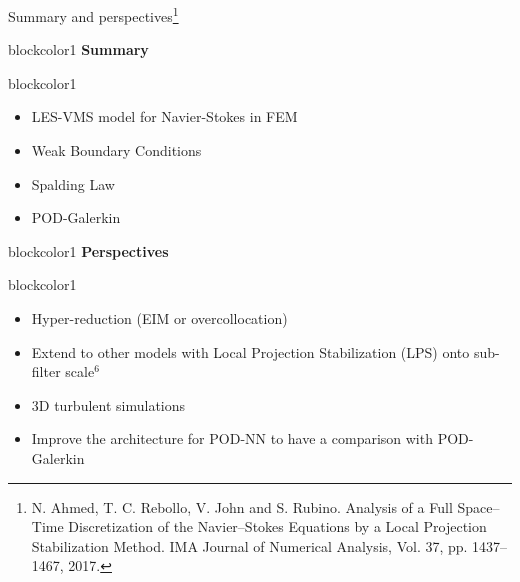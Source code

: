 \documentclass[9pt,compress,t,aspectratio=169]{beamer}
\newcommand{\1}{\begin{pmatrix}
		1\\
		1
\end{pmatrix}}
\newcommand{\highlight}[1]{\textbf{\color{bluemathlab}#1}}
\begin{document}
\begin{frame}[c]{Summary and perspectives\footnote{N. Ahmed, T. C. Rebollo, V. John and S. Rubino. Analysis of a Full Space–Time Discretization of the Navier–Stokes Equations by a Local Projection Stabilization Method. IMA Journal of Numerical Analysis, Vol. 37, pp. 1437–1467, 2017.}}
	\begin{minipage}[t]{0.49\textwidth}
		\begin{beamercolorbox}[sep=0.5em,wd=\textwidth]{blockcolor1}
				\centering
			\highlight{\LARGE Summary}
		\end{beamercolorbox}
		\begin{beamercolorbox}[sep=0.5em,wd=\textwidth]{blockcolor1}
			\Large
			\begin{itemize}
				\item LES-VMS model for Navier-Stokes in FEM
				\item Weak Boundary Conditions
				\item Spalding Law
				\item POD-Galerkin
			\end{itemize}
				
		\end{beamercolorbox}
	\end{minipage}
	\begin{minipage}[t]{0.49\textwidth}
	\begin{beamercolorbox}[sep=0.5em,wd=\textwidth]{blockcolor1}
		\centering
		\highlight{\LARGE Perspectives}
	\end{beamercolorbox}
	\begin{beamercolorbox}[sep=0.5em,wd=\textwidth]{blockcolor1}
		\Large
		\begin{itemize}
			\item Hyper-reduction (EIM or overcollocation)
			\item Extend to other models with Local Projection Stabilization (LPS) onto sub-filter scale$^6$
			\item 3D turbulent simulations
			\item Improve the architecture for POD-NN to have a comparison with POD-Galerkin
		\end{itemize}
		
	\end{beamercolorbox}
\end{minipage}

\end{frame}
\end{document}
